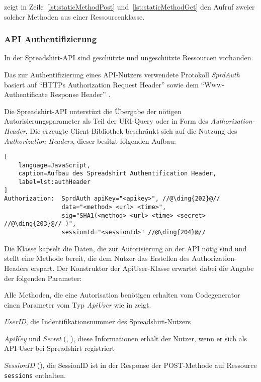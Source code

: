  zeigt in Zeile~\ref{lst:staticMethodPost} und~\ref{lst:staticMethodGet} den Aufruf zweier solcher Methoden aus einer Ressourcenklasse.

\subsubsection{API Authentifizierung}
\label{sec:api_auth}

In der Spreadshirt-\gls{API} sind geschützte und ungeschützte Ressourcen vorhanden. 

Das zur Authentifizierung eines \gls{API}-Nutzers verwendete Protokoll \emph{SprdAuth} basiert auf \enquote{\gls{HTTP}s Authorization Request Header} sowie dem \enquote{\textsc{Www}-Authentificate Response Header} \cite{apiSecurity}.

Die Spreadshirt-\gls{API} unterstüzt die Übergabe der nötigen Autorisierungsparameter als Teil der \gls{URI}-Query oder in Form des \emph{Authorization-Header}. Die erzeugte Client-Bibliothek beschränkt sich auf die Nutzung des \emph{Authorization-Headers}, dieser besitzt folgenden Aufbau:

\begin{minipage}{\textwidth}
\begin{lstlisting}[
    language=JavaScript,
    caption=Aufbau des Spreadshirt Authentification Header,
    label=lst:authHeader
]
Authorization:  SprdAuth apiKey="<apikey>", //@\ding{202}@// 
                data="<method> <url> <time>", 
                sig="SHA1(<method> <url> <time> <secret> //@\ding{203}@// )", 
                sessionId="<sessionId>" //@\ding{204}@//
\end{lstlisting}
\end{minipage}

Die Klasse  kapselt die Daten, die zur Autorisierung an der \gls{API} nötig sind und stellt eine Methode bereit, die dem Nutzer das Erstellen des Authorization-Headers erspart. Der Konstruktor der ApiUser-Klasse erwartet dabei die Angabe der folgenden Parameter:

Alle Methoden, die eine Autorisation benötigen erhalten vom Codegenerator einen Parameter vom Typ \emph{ApiUser} wie  in  zeigt.

\begin{compactitem}
    \item \emph{UserID}, die Indentifikationsnummer des Spreadshirt-Nutzers
    \item \emph{ApiKey} und \emph{Secret} (, ), diese Informationen erhält der Nutzer, wenn er sich als \gls{API}-User bei Spreadshirt registriert
    \item \emph{SessionID} (), die SessionID ist in der Response der POST-Methode auf Ressource \texttt{sessions} enthalten.
\end{compactitem}
